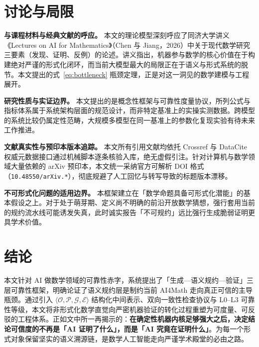 ﻿\documentclass[UTF8,a4paper,11pt]{ctexart}
\theoremstyle{definition}
\begin{document}
\section{讨论与局限}
\label{sec:discussion}

\textbf{与课程材料与经典文献的呼应。} 本文的理论模型深刻呼应了同济大学讲义《Lectures on AI for Mathematics》（Chen 与 Jiang，2026）中关于现代数学研究三要素（发现、证明、反例）的论述。讲义指出，机器参与数学的核心价值在于构建绝对严谨的形式化闭环，而当前大模型最大的局限正在于语义与形式系统的脱节。本文提出的式~\eqref{eq:bottleneck} 瓶颈定理，正是对这一洞见的数学建模与工程展开。

\textbf{研究性质与实证边界。} 本文提出的是概念性框架与可靠性度量协议，所列公式与指标体系属于系统架构层面的规范设计，而非特定基准上的实操实测数据。跨模型的系统比较仍属定性范畴，大规模多模型在同一基准上的参数化复现实验有待未来工作推进。

\textbf{文献真实性与预印本版本追踪。} 本文所有引用文献均依托 Crossref 与 DataCite 权威元数据接口通过机械脚本逐条核验入库，绝无虚假引注。针对计算机与数学领域大量依赖的 arXiv 预印本，本文统一采纳官方可解析 DOI 格式（\texttt{10.48550/arXiv.*}），彻底规避了人工回忆与转写导致的标题版本漂移。

\textbf{不可形式化问题的适用边界。} 本框架建立在「数学命题具备可形式化潜能」的基本假设之上。对于处于萌芽期、定义尚不明确的前沿开放数学猜想，强行套用当前的规约流水线可能诱发失真，此时诚实报告「不可规约」远比强行生成脆弱证明更具学术价值。

\section{结论}
\label{sec:conclusion}
本文针对 AI 做数学领域的可靠性赤字，系统提出了「生成—语义规约—验证」三层可靠性框架，明确论证了语义规约层是制约当前 AI4Math 走向真正可信的主导瓶颈。通过引入 $\langle \mathcal{O}, \mathcal{P}, \mathcal{G}, \mathcal{E} \rangle$ 结构化中间表示、双向一致性检查协议与 L0--L3 可靠性等级，本文将非形式化数学直觉向严密机器验证的转化过程重塑为可度量、可反驳的工程体系。正如文中所一再揭示的：\textbf{在确定性机器内核足够强大之后，决定结论可信度的不再是「AI 证明了什么」，而是「AI 究竟在证明什么」}。为每一个形式对象保留坚实的语义溯源链，是数学人工智能走向严谨学术殿堂的必由之路。



\end{document}
